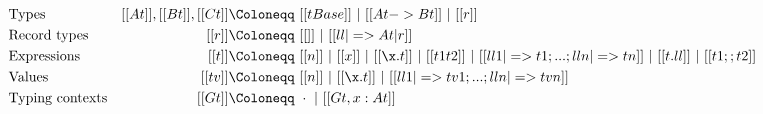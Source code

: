 { \small
    \begin{align*}
      &\text{Types}        &[[At]], [[Bt]], [[Ct]] \Coloneqq&~ [[tBase]] ~|~ [[At -> Bt]] ~|~ [[r]]  \\
      &\text{Record types} &[[r]]  \Coloneqq&~ [[{}]] ~|~ [[{ll |=> At | r}]]  \\
      &\text{Expressions}  &[[t]]  \Coloneqq&~ [[n]] ~|~ [[x]] ~|~
                                              [[\x.t]] ~|~ [[t1 t2]]
                                              ~|~[[ { ll1 |=> t1 ;
                                                    ... ; lln |=> tn } ]] ~|~ [[t.ll ]]~|~ [[t1;;t2]] \\
      &\text{Values}       &[[tv]] \Coloneqq&~ [[n]] ~|~ [[\x.t]] ~|~ [[ { ll1 |=> tv1 ; ... ; lln |=> tvn } ]] \\
      &\text{Typing contexts} &[[Gt]] \Coloneqq&~  \cdot ~|~ [[ Gt, x:At ]] %
    \end{align*}
}

